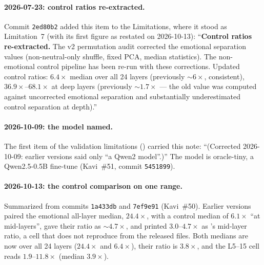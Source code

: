 \documentclass[11pt,a4paper]{article}
\begin{document}
\paragraph{2026-07-23: control ratios re-extracted.}
Commit \texttt{2ed80b2} added this item to the Limitations, where it stood
as Limitation~7 (with its first figure as restated on 2026-10-13):
``\textbf{Control ratios re-extracted.} The v2
permutation audit corrected the emotional separation values
(non-neutral-only shuffle, fixed PCA, median statistics). The
non-emotional control pipeline has been re-run with
these corrections. Updated control ratios: $6.4\times$
median over all 24 layers (previously ${\sim}6\times$, consistent),
$36.9\times$--$68.1\times$ at deep layers (previously
${\sim}1.7\times$ --- the old value was computed against
uncorrected emotional separation and substantially
underestimated control separation at depth).''

\paragraph{2026-10-09: the model named.}
The first item of the validation limitations () carried
this note: ``(Corrected 2026-10-09: earlier versions said only
``a Qwen2 model''.)'' The model is oracle-tiny, a Qwen2.5-0.5B fine-tune
(Kavi~\#51, commit \texttt{5451899}).

\paragraph{2026-10-13: the control comparison on one range.}
Summarized from commits \texttt{1a433db} and \texttt{7ef9e91} (Kavi~\#50).
Earlier versions paired the emotional all-layer median, $24.4\times$, with
a control median of $6.1\times$ ``at mid-layers'', gave their ratio as
${\sim}4.7\times$, and printed $3.0$--$4.7\times$ as 's
mid-layer ratio, a cell that does not reproduce from the released files.
Both medians are now over all 24 layers ($24.4\times$ and $6.4\times$),
their ratio is $3.8\times$, and the L5--15 cell reads
$1.9$--$11.8\times$ (median $3.9\times$).
\end{document}
